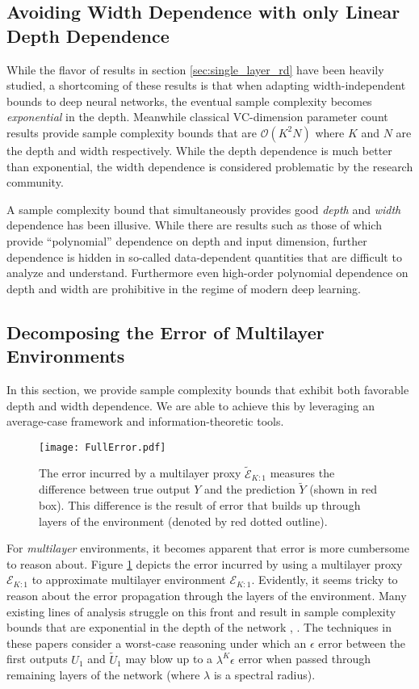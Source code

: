 \documentclass[twoside,11pt]{article}
\def\environment{\mathcal{E}}
\def\proxy{\tilde{\environment}}
\begin{document}
\subsection{Avoiding Width Dependence with only Linear Depth Dependence}
While the flavor of results in section \ref{sec:single_layer_rd} have been heavily studied, a shortcoming of these results is that when adapting width-independent bounds to deep neural networks, the eventual sample complexity becomes \emph{exponential} in the depth. Meanwhile classical VC-dimension parameter count results provide sample complexity bounds that are $\mathcal{O}(K^2N)$ where $K$ and $N$ are the depth and width respectively.  While the depth dependence is much better than exponential, the width dependence is considered problematic by the research community.

A sample complexity bound that simultaneously provides good \emph{depth} and \emph{width} dependence has been illusive. While there are results such as those of \cite{NEURIPS2019_0e795480} which provide ``polynomial'' dependence on depth and input dimension, further dependence is hidden in so-called data-dependent quantities that are difficult to analyze and understand. Furthermore even high-order polynomial dependence on depth and width are prohibitive in the regime of modern deep learning.

\subsection{Decomposing the Error of Multilayer Environments}
\label{sec:error_decomp}

In this section, we provide sample complexity bounds that exhibit both favorable depth and width dependence. We are able to achieve this by leveraging an average-case framework and information-theoretic tools.
\label{subsec:single_multi_env}
\begin{figure}[!ht]
    \centering
    \texttt{[image: FullError.pdf]}
    \caption{The error incurred by a multilayer proxy $\proxy_{K:1}$ measures the difference between true output $Y$ and the prediction $\tilde{Y}$ (shown in red box). This difference is the result of error that builds up through layers of the environment (denoted by red dotted outline).}
    \label{fig:full_error}
\end{figure}

For \emph{multilayer} environments, it becomes apparent that error is more cumbersome to reason about. Figure \ref{fig:full_error} depicts the error incurred by using a multilayer proxy $\environment_{K:1}$ to approximate multilayer environment $\environment_{K:1}$. Evidently, it seems tricky to reason about the error propagation through the layers of the environment. Many existing lines of analysis struggle on this front and result in sample complexity bounds that are exponential in the depth of the network \cite{bartlett2017spectrally}, \cite{pmlr-v75-golowich18a}. The techniques in these papers consider a worst-case reasoning under which an $\epsilon$ error between the first outputs $U_1$ and $\tilde{U}_1$ may blow up to a $\lambda^K\epsilon$ error when passed through remaining layers of the network (where $\lambda$ is a spectral radius).
\end{document}
